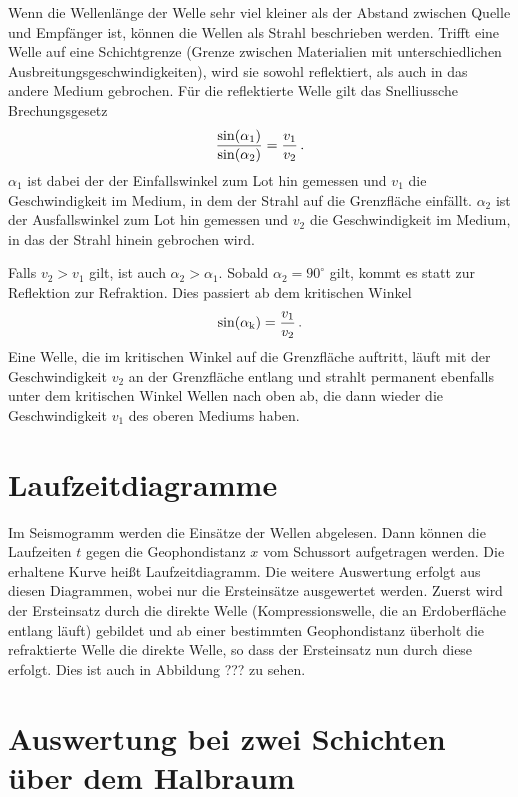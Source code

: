 Wenn die Wellenlänge der Welle sehr viel kleiner als der Abstand zwischen Quelle und Empfänger ist, können die Wellen als Strahl beschrieben werden. Trifft eine Welle auf eine Schichtgrenze (Grenze zwischen Materialien mit unterschiedlichen Ausbreitungsgeschwindigkeiten), wird sie sowohl reflektiert, als auch in das andere Medium gebrochen. Für die reflektierte Welle gilt das Snelliussche Brechungsgesetz
\begin{equation}
 \frac{\sin(\alpha_1)}{\sin(\alpha_2)}=\frac{v_1}{v_2}\text{\,.}
\end{equation}
$\alpha_1$ ist dabei der der Einfallswinkel zum Lot hin gemessen und $v_1$ die Geschwindigkeit im Medium, in dem der Strahl auf die Grenzfläche einfällt. $\alpha_2$ ist der Ausfallswinkel zum Lot hin gemessen und $v_2$ die Geschwindigkeit im Medium, in das der Strahl hinein gebrochen wird.

Falls $v_2>v_1$ gilt, ist auch $\alpha_2>\alpha_1$. Sobald $\alpha_2=90^\circ$ gilt, kommt es statt zur Reflektion zur Refraktion. Dies passiert ab dem kritischen Winkel
\begin{equation}
 \sin(\alpha_{\mathrm{k}}) =\frac{v_1}{v_2} \text{\,.}
\end{equation}
Eine Welle, die im kritischen Winkel auf die Grenzfläche auftritt, läuft mit der Geschwindigkeit $v_2$ an der Grenzfläche entlang und strahlt permanent ebenfalls unter dem kritischen Winkel Wellen nach oben ab, die dann wieder die Geschwindigkeit $v_1$ des oberen Mediums haben.

\section{Laufzeitdiagramme}

Im Seismogramm werden die Einsätze der Wellen abgelesen. Dann können die Laufzeiten $t$ gegen die Geophondistanz $x$ vom Schussort aufgetragen werden. Die erhaltene Kurve heißt Laufzeitdiagramm. Die weitere Auswertung erfolgt aus diesen Diagrammen, wobei nur die Ersteinsätze ausgewertet werden. Zuerst wird der Ersteinsatz durch die direkte Welle (Kompressionswelle, die an Erdoberfläche entlang läuft) gebildet und ab einer bestimmten Geophondistanz überholt die refraktierte Welle die direkte Welle, so dass der Ersteinsatz nun durch diese erfolgt. Dies ist auch in Abbildung ??? zu sehen.

\section{Auswertung bei zwei Schichten über dem Halbraum}
\label{sec:zweiSchichten}

